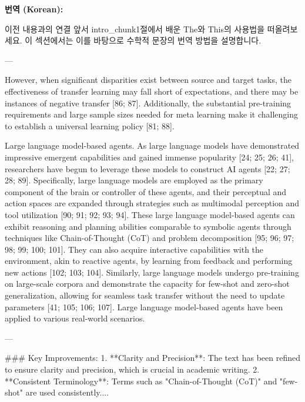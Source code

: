 \documentclass[12pt,a4paper]{article}
\begin{document}
\begin{mdframed}[style=ko]
\noindent\textbf{\small 번역 (Korean):}\\[2pt]
\begin{linkbox}{이전 내용과의 연결}
  앞서 intro_chunk1절에서 배운 The와 This의 사용법을 떠올려보세요. 이 섹션에서는 이를 바탕으로 수학적 문장의 번역 방법을 설명합니다.
\end{linkbox}
---

However, when significant disparities exist between source and target tasks, the effectiveness of transfer learning may fall short of expectations, and there may be instances of negative transfer [86; 87]. Additionally, the substantial pre-training requirements and large sample sizes needed for meta learning make it challenging to establish a universal learning policy [81; 88].

Large language model-based agents. As large language models have demonstrated impressive emergent capabilities and gained immense popularity [24; 25; 26; 41], researchers have begun to leverage these models to construct AI agents [22; 27; 28; 89]. Specifically, large language models are employed as the primary component of the brain or controller of these agents, and their perceptual and action spaces are expanded through strategies such as multimodal perception and tool utilization [90; 91; 92; 93; 94]. These large language model-based agents can exhibit reasoning and planning abilities comparable to symbolic agents through techniques like Chain-of-Thought (CoT) and problem decomposition [95; 96; 97; 98; 99; 100; 101]. They can also acquire interactive capabilities with the environment, akin to reactive agents, by learning from feedback and performing new actions [102; 103; 104]. Similarly, large language models undergo pre-training on large-scale corpora and demonstrate the capacity for few-shot and zero-shot generalization, allowing for seamless task transfer without the need to update parameters [41; 105; 106; 107]. Large language model-based agents have been applied to various real-world scenarios.

---

### Key Improvements:
1. **Clarity and Precision**: The text has been refined to ensure clarity and precision, which is crucial in academic writing.
2. **Consistent Terminology**: Terms such as "Chain-of-Thought (CoT)" and "few-shot" are used consistently....
\end{mdframed}
\vspace{1em}
\end{document}
